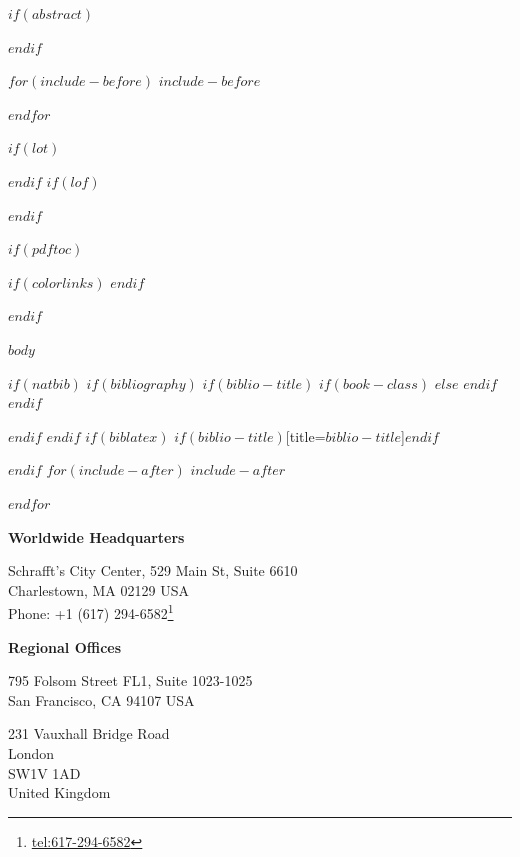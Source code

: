 \documentclass[$if(fontsize)$$fontsize$,$endif$$if(lang)$$babel-lang$,$endif$$if(papersize)$$papersize$paper,$endif$$for(classoption)$$classoption$$sep$,$endfor$]{article}
\renewcommand{\href}[2]{#2\footnote{\url{#1}}}
\begin{document}
\begin{titlepage}
\end{titlepage}

\newpage


$if(abstract)$
 \begin{abstract}
     $abstract$
 \end{abstract}
 \newpage
$endif$



$for(include-before)$
$include-before$

$endfor$

$if(lot)$
\newpage
\listoftables
$endif$
$if(lof)$
\newpage
\listoffigures
$endif$

$if(pdftoc)$
{
$if(colorlinks)$
\hypersetup{linkcolor=$if(toccolor)$$toccolor$$else$black$endif$}
$endif$
\setcounter{tocdepth}{$toc-depth$}
\tableofcontents
{}
}
$endif$

\newpage
{}
$body$

$if(natbib)$
$if(bibliography)$
$if(biblio-title)$
$if(book-class)$
\renewcommand\bibname{$biblio-title$}
$else$
\renewcommand\refname{$biblio-title$}
$endif$
$endif$
\newpage


$endif$
$endif$
$if(biblatex)$
\newpage
\printbibliography$if(biblio-title)$[title=$biblio-title$]$endif$

$endif$
$for(include-after)$
$include-after$

$endfor$

\newpage

\textcolor{sbblue}{\large{\textbf{Worldwide Headquarters}}}

Schrafft's City Center, 529 Main St, Suite 6610\\
Charlestown, MA 02129 USA\\
Phone: \href{tel:617-294-6582}{+1 (617) 294-6582}

\vskip 0.1in

\textcolor{sbblue}{\large{\textbf{Regional Offices}}}

795 Folsom Street FL1, Suite 1023-1025\\
San Francisco, CA 94107 USA

\vskip 0.1in

231 Vauxhall Bridge Road\\
London\\
SW1V 1AD\\
United Kingdom

\vskip 0.1in
\end{document}
